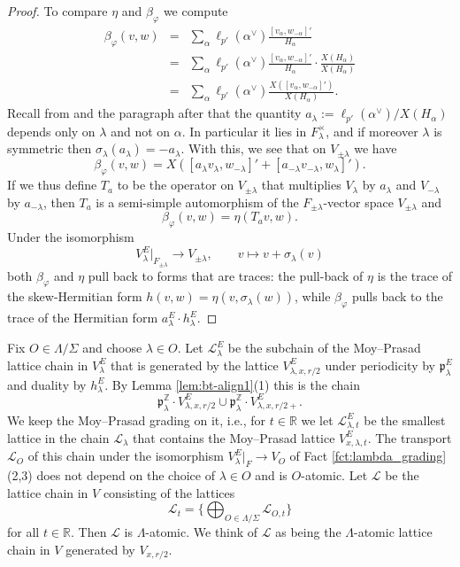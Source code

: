 \documentclass{article}
\def\mf#1{\mathfrak{#1}}
\def\mc#1{\mathcal{#1}}
\def\R{\mathbb{R}}
\def\Z{\mathbb{Z}}
\theoremstyle{definition}
\numberwithin{equation}{subsection}
\renewcommand{\-}{\hyp{}}
\begin{document}
\begin{proof}
To compare $\eta$ and $\beta_\varphi$ we compute
\begin{eqnarray*}
	\beta_\varphi(v,w)&=&\sum_{\alpha}\ell_{p'}(\alpha^\vee)\frac{[v_\alpha,w_{-\alpha}]'}{H_\alpha}\\
	&=&\sum_{\alpha}\ell_{p'}(\alpha^\vee)\frac{[v_\alpha,w_{-\alpha}]'}{H_\alpha} \cdot \frac{X(H_\alpha)}{X(H_\alpha)}\\
	&=&\sum_{\alpha}\ell_{p'}(\alpha^\vee)\frac{X([v_\alpha,w_{-\alpha}]')}{X(H_\alpha)}.
\end{eqnarray*}
Recall from \cite[Lemma 5.4.9]{FKS23} and the paragraph after \cite[(4.2.5)]{FKS23} that the quantity $a_\lambda:=\ell_{p'}(\alpha^\vee)/X(H_\alpha)$ depends only on $\lambda$ and not on $\alpha$. In particular it lies in $F_\lambda^\times$, and if moreover $\lambda$ is symmetric then $\sigma_\lambda(a_\lambda)=-a_\lambda$. With this, we see that on $V_{\pm\lambda}$ we have
\[ \beta_\varphi(v,w)= X([a_\lambda v_{\lambda},w_{-\lambda}]'+[a_{-\lambda} v_{-\lambda},w_{\lambda}]').\]
If we thus define $T_a$ to be the operator on $V_{\pm\lambda}$ that multiplies $V_\lambda$ by $a_\lambda$ and $V_{-\lambda}$ by $a_{-\lambda}$, then $T_a$ is a semi-simple automorphism of the $F_{\pm\lambda}$-vector space $V_{\pm\lambda}$ and 
\[ \beta_\varphi(v,w)=\eta(T_av,w). \]
Under the isomorphism
\[ V_\lambda^E|_{F_{\pm\lambda}} \to V_{\pm\lambda},\qquad v \mapsto v+\sigma_{\lambda}(v) \]
both $\beta_\varphi$ and $\eta$ pull back to forms that are traces: the pull-back of $\eta$ is the trace of the skew-Hermitian form $h(v,w)=\eta(v,\sigma_{\lambda}(w))$, while $\beta_\varphi$ pulls back to the trace of the Hermitian form $a_\lambda^E \cdot h_\lambda^E$.
\end{proof}

Fix $O \in \Lambda/\Sigma$ and choose $\lambda \in O$. Let $\mc{L}_\lambda^E$ be the subchain of the Moy--Prasad lattice chain in $V_\lambda^E$ that is generated by the lattice $V_{\lambda,x,r/2}^E$ under periodicity by $\mf{p}_\lambda^E$ and duality by $h_\lambda^E$. By Lemma \ref{lem:bt-align1}(1) this is the chain
\[ \mf{p}_\lambda^\Z \cdot V_{\lambda,x,r/2}^E \cup \mf{p}_\lambda^\Z \cdot V_{\lambda,x,r/2+}^E. \]
We keep the Moy--Prasad grading on it, i.e., for $t \in \R$ we let $\mc{L}_{\lambda,t}^E$ be the smallest lattice in the chain $\mc{L}_{\lambda}$ that contains the Moy--Prasad lattice $V_{x,\lambda,t}^E$. The transport $\mc{L}_O$ of this chain under the isomorphism $V_\lambda^E|_F \to V_O$ of Fact \ref{fct:lambda_grading}(2,3) does not depend on the choice of $\lambda \in O$ and is $O$-atomic. Let $\mc{L}$ be the lattice chain in $V$ consisting of the lattices
\[ \mc{L}_t = \{\bigoplus_{O \in \Lambda/\Sigma} \mc{L}_{O,t} \} \]
for all $t \in \R$.
Then $\mc{L}$ is $\Lambda$-atomic. We think of $\mc{L}$ as being the $\Lambda$-atomic lattice chain in $V$ generated by $V_{x,r/2}$.
\end{document}
